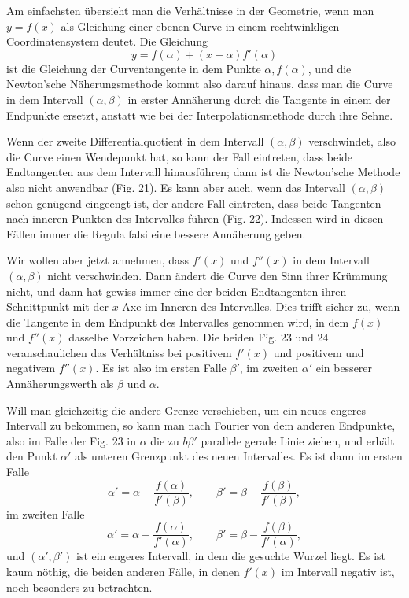 \documentclass[11pt]{article}
\begin{document}
Am einfachsten übersieht man die Verhältnisse in der Geometrie, wenn man $y=f(x)$ als Gleichung einer ebenen Curve in einem rechtwinkligen Coordinatensystem deutet. Die Gleichung
\[
        y=f(\alpha)+(x-\alpha)f'(\alpha)
\tag{3}
\]
ist die Gleichung der Curventangente in dem Punkte $\alpha,f(\alpha)$, und die Newton'sche Näherungsmethode kommt also darauf hinaus, dass man die Curve in dem Intervall $(\alpha,\beta)$ in erster Annäherung durch die Tangente in einem der Endpunkte ersetzt, anstatt wie bei der Interpolationsmethode durch ihre Sehne.

\weberfigtwentyone
\weberfigtwentytwo
\weberfigtwentythree
\weberfigtwentyfour

Wenn der zweite Differentialquotient in dem Intervall $(\alpha,\beta)$ verschwindet, also die Curve einen Wendepunkt hat, so kann der Fall eintreten, dass beide Endtangenten aus dem Intervall hinausführen; dann ist die Newton'sche Methode also nicht anwendbar (Fig. 21). Es kann aber auch, wenn das Intervall $(\alpha,\beta)$ schon genügend eingeengt ist, der andere Fall eintreten, dass beide Tangenten nach inneren Punkten des Intervalles führen (Fig. 22). Indessen wird in diesen Fällen immer die Regula falsi eine bessere Annäherung geben.

Wir wollen aber jetzt annehmen, dass $f'(x)$ und $f''(x)$ in dem Intervall $(\alpha,\beta)$ nicht verschwinden. Dann ändert die Curve den Sinn ihrer Krümmung nicht, und dann hat gewiss immer eine der beiden Endtangenten ihren Schnittpunkt mit der $x$-Axe im Inneren des Intervalles. Dies trifft sicher zu, wenn die Tangente in dem Endpunkt des Intervalles genommen wird, in dem $f(x)$ und $f''(x)$ dasselbe Vorzeichen haben. Die beiden Fig. 23 und 24 veranschaulichen das Verhältniss bei positivem $f'(x)$ und positivem und negativem $f''(x)$. Es ist also im ersten Falle $\beta'$, im zweiten $\alpha'$ ein besserer Annäherungswerth als $\beta$ und $\alpha$.

Will man gleichzeitig die andere Grenze verschieben, um ein neues engeres Intervall zu bekommen, so kann man nach Fourier von dem anderen Endpunkte, also im Falle der Fig. 23 in $\alpha$ die zu $b\beta'$ parallele gerade Linie ziehen, und erhält den Punkt $\alpha'$ als unteren Grenzpunkt des neuen Intervalles. Es ist dann im ersten Falle
\[
        \alpha'=\alpha-\frac{f(\alpha)}{f'(\beta)},\qquad
        \beta'=\beta-\frac{f(\beta)}{f'(\beta)},
\]
im zweiten Falle
\[
        \alpha'=\alpha-\frac{f(\alpha)}{f'(\alpha)},\qquad
        \beta'=\beta-\frac{f(\beta)}{f'(\alpha)},
\]
und $(\alpha',\beta')$ ist ein engeres Intervall, in dem die gesuchte Wurzel liegt. Es ist kaum nöthig, die beiden anderen Fälle, in denen $f'(x)$ im Intervall negativ ist, noch besonders zu betrachten.
\end{document}
